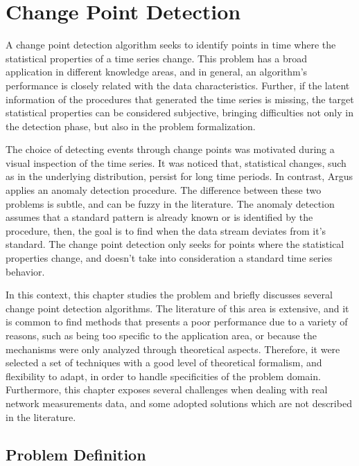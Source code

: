 \chapter{Change Point Detection}
\label{chap:change_point_detection}

A change point detection algorithm seeks to identify points in time where the
statistical properties of a time series change. This problem has a broad
application in different knowledge areas, and in general, an algorithm's
performance is closely related with the data characteristics.
Further, if the latent information of the procedures that generated the time
series is missing, the target statistical properties can be considered
subjective, bringing difficulties not only in the detection phase, but also in
the problem formalization.

The choice of detecting events through change points was motivated during a
visual inspection of the time series.
It was noticed that, statistical changes, such as in the underlying
distribution, persist for long time periods.
In contrast, Argus applies an anomaly detection procedure.
The difference between
these two problems is subtle, and can be fuzzy in the literature. The
anomaly detection assumes that a standard pattern is already known or
is identified by the procedure, then, the goal is to find when the data
stream
deviates from it's standard. The change point detection only seeks for
points where the statistical properties change, and doesn't take into
consideration a standard time series behavior.

In this context, this chapter studies the problem and briefly discusses
several change point detection algorithms. The literature of this area is
extensive, and it is common to find methods that presents a poor performance
due to a variety of reasons, such as being too specific to the application
area, or because the mechanisms were only analyzed through theoretical
aspects. Therefore, it were selected a set of techniques with a good level
of theoretical formalism, and flexibility to adapt, in order to handle
specificities of the problem domain. Furthermore, this chapter exposes several
challenges when dealing with real network measurements data,
and some adopted solutions which are not described in the literature.

\section{Problem Definition}

